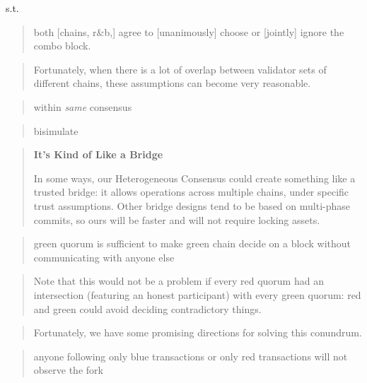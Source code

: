 \documentclass{article}
\theoremstyle{definition}
\begin{document}
s.t.

\begin{quote}
  both [chains, r\&b,] agree to [unanimously] choose or [jointly] ignore the combo block.
\end{quote}

\begin{quote}
  Fortunately, 
  when there is a lot of overlap between
  validator sets of different chains, 
  these assumptions can become very reasonable.
\end{quote}

\begin{quote}
  within \emph{same} consensus
\end{quote}

\begin{quote}
  bisimulate
\end{quote}

\begin{quote}
  \textbf{It's Kind of Like a Bridge}

  In some ways, 
  our Heterogeneous Consensus could create something like 
  a trusted bridge: 
  it allows operations across multiple chains,
  under specific trust assumptions. 
  Other bridge designs tend to be based on multi-phase commits,
  so ours will be faster and will not require locking assets.
\end{quote}

\begin{quote}
  green quorum is sufficient to make green chain decide on a block without communicating with anyone else
\end{quote}

 \begin{quote}
   Note that this would not be a problem if every red quorum had an intersection (featuring an honest participant) with every green quorum: red and green could avoid deciding contradictory things.
 \end{quote}

 \begin{quote}
    Fortunately, we have some promising directions for solving this conundrum.
  \end{quote}

\begin{quote}
    anyone following only blue transactions or only red transactions will not observe the fork
\end{quote}
\end{document}
